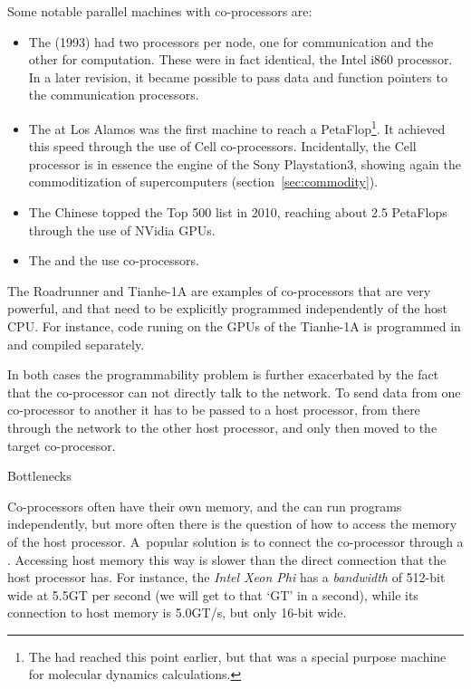 Some notable parallel machines with co-processors are:
\begin{itemize}
\item The  (1993) had two processors per
  node, one for communication and the other for computation. These
  were in fact identical, the Intel i860
  processor. In a later revision, it became possible to pass data and
  function pointers to the communication processors.
\item The  at Los Alamos was the first
  machine to reach a PetaFlop\footnote{The 
    had reached this point earlier, but that was a special purpose
    machine for molecular dynamics calculations.}. It achieved this
  speed through the use of Cell
  co-processors. Incidentally, the Cell processor is in essence the
  engine of the Sony Playstation3, showing again the commoditization
  of supercomputers (section~\ref{sec:commodity}).
\item The Chinese  topped the Top 500 list in
  2010, reaching about 2.5 PetaFlops through the use of
  NVidia \acp{GPU}.
\item The  and the 
  use  co-processors.
\end{itemize}
The Roadrunner and Tianhe-1A are examples of co-processors that are
very powerful, and that need to be explicitly programmed independently
of the host CPU. For instance, code runing on the \acp{GPU} of the
Tianhe-1A is programmed in  and compiled separately.

In both cases the programmability problem is further exacerbated by
the fact that the co-processor can not directly talk to the network.
To send data from one co-processor to another it has to be passed to a
host processor, from there through the network to the other host
processor, and only then moved to the target co-processor.


 {Bottlenecks}

Co-processors often have their own memory, and the
 can run programs independently, but
more often there is the question of how to access the memory of the
host processor. A~popular solution is to connect the co-processor
through a . Accessing host memory this way is
slower than the direct connection that the host processor has. For
instance, the \emph{Intel Xeon Phi} has a
\emph{bandwidth} of 512-bit wide at
5.5GT per second (we will get to that `GT' in a second), while its
connection to host memory is 5.0GT/s, but only 16-bit wide.

